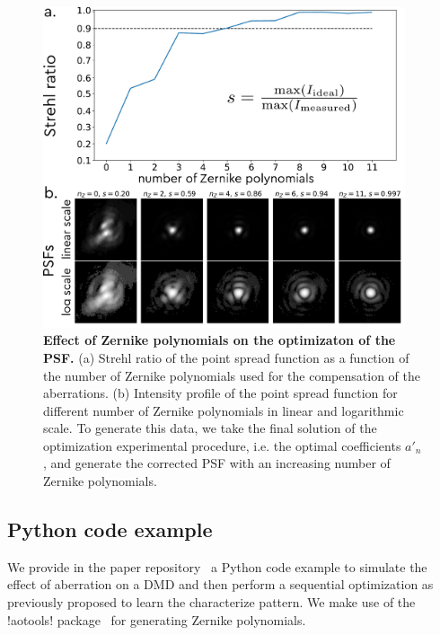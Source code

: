\documentclass[12pt]{iopart}
\begin{document}
\begin{figure}
  \centering
  \includegraphics[width = 0.95\textwidth]{images/Zernike_2.pdf}
  \caption{
    \textbf{Effect of Zernike polynomials on the optimizaton of the PSF.}
    (a) Strehl ratio of the point spread function as a function of the number of Zernike polynomials used
    for the compensation of the aberrations.
    (b) Intensity profile of the point spread function for different number of Zernike polynomials
    in linear and logarithmic scale.
    To generate this data, we take the final solution of the optimization experimental procedure,
    i.e. the optimal coefficients $a'_n$,
    and generate the corrected PSF with an increasing number of Zernike polynomials.
  }
  \label{fig:zernike}
\end{figure}


\subsection{Python code example}

We provide in the paper repository~\cite{github} a Python code example
to simulate the effect of aberration on a DMD
and then perform a sequential optimization as previously proposed
to learn the characterize pattern.
We make use of the !aotools! package~\cite{Townson2019aotools} for generating Zernike polynomials.

\end{document}
